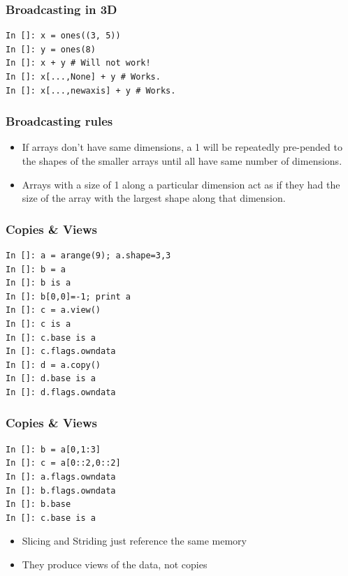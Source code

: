 \documentclass[14pt,compress]{beamer}
\newcounter{time}
\newcommand{\inctime}[1]{\addtocounter{time}{#1}{\tiny \thetime\ m}}
\begin{document}
\begin{frame}[fragile]
  \frametitle{Broadcasting in 3D}
    \begin{lstlisting}
In []: x = ones((3, 5))
In []: y = ones(8)
In []: x + y # Will not work!
In []: x[...,None] + y # Works.
In []: x[...,newaxis] + y # Works.
    \end{lstlisting}
\end{frame}

\begin{frame}[fragile]
  \frametitle{Broadcasting rules}
  \begin{itemize}

      \item If arrays don't have same dimensions, a 1 will be
          repeatedly pre-pended to the shapes of the smaller arrays
          until all have same number of dimensions.

      \item Arrays with a size of 1 along a particular dimension act as
          if they had the size of the array with the largest shape along
          that dimension.

  \end{itemize}
  \inctime{10}
\end{frame}

\begin{frame}[fragile]
  \frametitle{Copies \& Views}
  \vspace{-0.1in}
  \begin{lstlisting}
In []: a = arange(9); a.shape=3,3
In []: b = a
In []: b is a
In []: b[0,0]=-1; print a
In []: c = a.view()
In []: c is a
In []: c.base is a
In []: c.flags.owndata
In []: d = a.copy()
In []: d.base is a
In []: d.flags.owndata
  \end{lstlisting}
\end{frame}

\begin{frame}[fragile]
  \frametitle{Copies \& Views}
  \vspace{-0.1in}
  \begin{lstlisting}
In []: b = a[0,1:3]
In []: c = a[0::2,0::2]
In []: a.flags.owndata
In []: b.flags.owndata
In []: b.base
In []: c.base is a
  \end{lstlisting}
  \begin{itemize}
  \item Slicing and Striding just reference the same memory
  \item They produce views of the data, not copies
  \end{itemize}
\end{frame}
\end{document}
